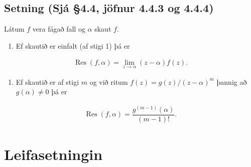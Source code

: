 \documentclass[a4paper,10pt,icelandic]{sphinxmanual}
\begin{document}
\subsection{Setning (Sjá \S{}4.4, jöfnur 4.4.3 og 4.4.4)}
\label{\detokenize{Kafli04:setning-sja-4-4-jofnur-4-4-3-og-4-4-4}}
Látum \(f\) vera fágað fall og \(\alpha\) skaut \(f\).
\begin{enumerate}
%
\item {} 
Ef skautið er einfalt (af stigi 1) þá er

\end{enumerate}
\begin{equation*}
\begin{split}\operatorname{Res}(f,\alpha)=\lim_{z\to \alpha}(z-\alpha)f(z).\end{split}
\end{equation*}\begin{enumerate}
%
\setcounter{enumi}{1}
\item {} 
Ef skautið er af stigi \(m\) og við ritum \(f(z)=g(z)/(z-\alpha)^m\) þannig að \(g(\alpha)\neq 0\) þá er

\end{enumerate}
\begin{equation*}
\begin{split}\operatorname{Res}(f,\alpha)=\dfrac{g^{(m-1)}(\alpha)}{(m-1)!}.\end{split}
\end{equation*}

\section{Leifasetningin}
\label{\detokenize{Kafli04:leifasetningin}}
\end{document}
